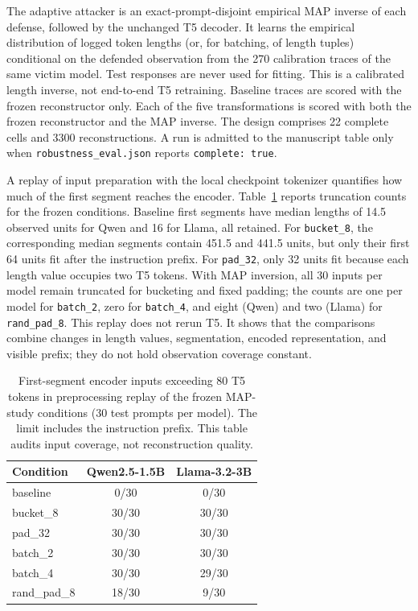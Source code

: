 \documentclass[electronics,article,submit,pdftex,moreauthors]{Definitions/mdpi}
\begin{document}
The adaptive attacker is an exact-prompt-disjoint empirical MAP inverse of each defense, followed by the unchanged T5 decoder. It learns the empirical distribution of logged token lengths (or, for batching, of length tuples) conditional on the defended observation from the 270 calibration traces of the same victim model. Test responses are never used for fitting. This is a calibrated length inverse, not end-to-end T5 retraining. Baseline traces are scored with the frozen reconstructor only. Each of the five transformations is scored with both the frozen reconstructor and the MAP inverse. The design comprises 22 complete cells and 3300 reconstructions. A run is admitted to the manuscript table only when \texttt{robustness\_eval.json} reports \texttt{complete: true}.

A replay of input preparation with the local checkpoint tokenizer quantifies how much of the first segment reaches the encoder. Table~\ref{tab:encoder_coverage} reports truncation counts for the frozen conditions. Baseline first segments have median lengths of 14.5 observed units for Qwen and 16 for Llama, all retained. For \texttt{bucket\_8}, the corresponding median segments contain 451.5 and 441.5 units, but only their first 64 units fit after the instruction prefix. For \texttt{pad\_32}, only 32 units fit because each length value occupies two T5 tokens. With MAP inversion, all 30 inputs per model remain truncated for bucketing and fixed padding; the counts are one per model for \texttt{batch\_2}, zero for \texttt{batch\_4}, and eight (Qwen) and two (Llama) for \texttt{rand\_pad\_8}. This replay does not rerun T5. It shows that the comparisons combine changes in length values, segmentation, encoded representation, and visible prefix; they do not hold observation coverage constant.

\begin{table}[ht]
\centering
\caption{First-segment encoder inputs exceeding 80 T5 tokens in preprocessing replay of the frozen MAP-study conditions (30 test prompts per model). The limit includes the instruction prefix. This table audits input coverage, not reconstruction quality.}
\label{tab:encoder_coverage}
\begin{tabular}{l c c}
\toprule
Condition & Qwen2.5-1.5B & Llama-3.2-3B \\
\midrule
baseline & 0/30 & 0/30 \\
bucket\_8 & 30/30 & 30/30 \\
pad\_32 & 30/30 & 30/30 \\
batch\_2 & 30/30 & 30/30 \\
batch\_4 & 30/30 & 29/30 \\
rand\_pad\_8 & 18/30 & 9/30 \\
\bottomrule
\end{tabular}
\end{table}
\end{document}

